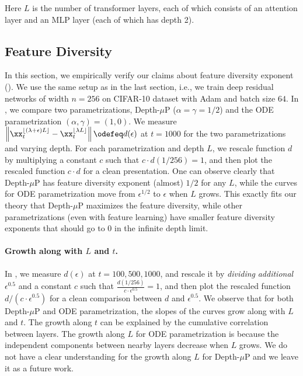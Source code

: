 Here $L$ is the number of transformer layers, each of which consists of an attention layer and an MLP layer (each of which has depth 2).

\subsection{Feature Diversity}

In this section, we empirically verify our claims about feature diversity exponent (). We use the same setup as in the last section, i.e., we train deep residual networks of width $n=256$ on CIFAR-10 dataset with Adam and batch size $64$. In , we compare two parametrizations, Depth-$\mu$P ($\alpha=\gamma=1/2$) and the ODE parametrization $(\alpha,\gamma)=(1,0)$. We measure $\left\| \xx^{\lfloor (\lambda + \epsilon) L \rfloor}_t - \xx_t^{\lfloor \lambda L \rfloor} \right\|\odefeq d(\epsilon)$ at $t=1000$ for the two parametrizations and varying depth. For each parametrization and depth $L$, we rescale function $d$ by multiplying a constant $c$ such that $c\cdot d(1/256)=1$, and then plot the rescaled function $c\cdot d$ for a clean presentation. One can observe clearly that Depth-$\mu$P has feature diversity exponent (almost) $1/2$ for any $L$, while the curves for ODE parametrization move from $\epsilon^{1/2}$ to $\epsilon$ when $L$ grows.   This exactly fits our theory that Depth-$\mu$P maximizes the feature diversity, while other parametrizations (even with feature learning) have smaller feature diversity exponents that should go to $0$ in the infinite depth limit.

\paragraph{Growth along with $L$ and $t$.} In , we measure $d(\epsilon)$ at $t=100, 500, 1000$, and rescale it by \emph{dividing} \emph{additional} $\epsilon^{0.5}$ and a constant $c$ such that $\frac{d(1/256)}{c\cdot \epsilon^{0.5}}=1$, and then plot the rescaled function $d/(c\cdot \epsilon^{0.5})$ for a clean comparison between $d$ and $\epsilon^{0.5}$. We observe that for both Depth-$\mu$P and ODE parametrization, the slopes of the curves grow along with $L$ and $t$. The growth along $t$ can be explained by the cumulative correlation between layers. The growth along $L$ for ODE parametrization is because the independent components between nearby layers decrease when $L$ grows. We do not have a clear understanding for the growth along $L$ for Depth-$\mu$P and we leave it as a future work.


